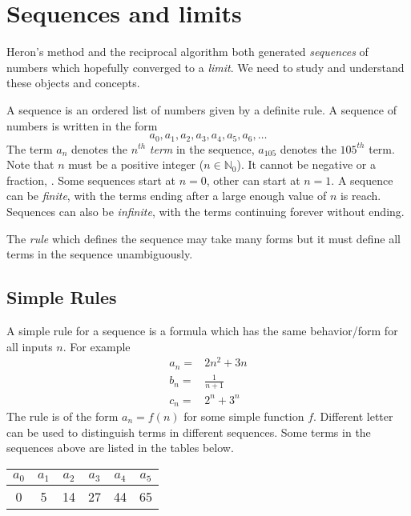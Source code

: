 \documentclass[11pt,a4paper,titlepage,oneside,openany]{article}
\begin{document}
\section*{Sequences and limits}

Heron's method and the reciprocal algorithm both generated \emph{sequences} of numbers which hopefully converged to a \emph{limit}. We need to study and understand these objects and concepts.

A sequence is an ordered list of numbers given by a definite rule. A sequence of numbers is written in the form
\begin{equation*}
 a_0,a_1,a_2,a_3,a_4,a_5,a_6,\ldots
\end{equation*}
The term $a_n$ denotes the $n^{th}$ \emph{term} in the sequence, \eg $a_{105}$ denotes the $105^{th}$ term. Note that $n$ must be a positive integer ($n \in \mathbb{N}_0$). It cannot be negative or a fraction, \etc. Some sequences start at $n=0$, other can start at $n=1$. A sequence can be \emph{finite}, with the terms ending after a large enough value of $n$ is reach. Sequences can also be \emph{infinite}, with the terms continuing forever without ending.

The \emph{rule} which defines the sequence may take many forms but it must define all terms in the sequence unambiguously.

\subsection*{Simple Rules}

A simple rule for a sequence is a formula which has the same behavior/form for all inputs $n$. For example
\begin{align*}
  a_n=&2n^2+3n\\%
  b_n=&\frac{1}{n+1}\\%
  c_n=&2^n+3^n%
\end{align*}
The rule is of the form $a_n=f(n)$ for some simple function $f$. Different letter can be used to distinguish terms in different sequences. Some terms in the sequences above are listed in the tables below.

\begin{center}

\begin{tabular}{|c|c|c|c|c|c|}
\hline
$a_0$ & $a_1$ & $a_2$ & $a_3$ & $a_4$ & $a_5$ \\
\hline
  0 & 5 & 14 & 27 & 44 & 65  \\
\hline
\end{tabular}
\end{center}
\end{document}
